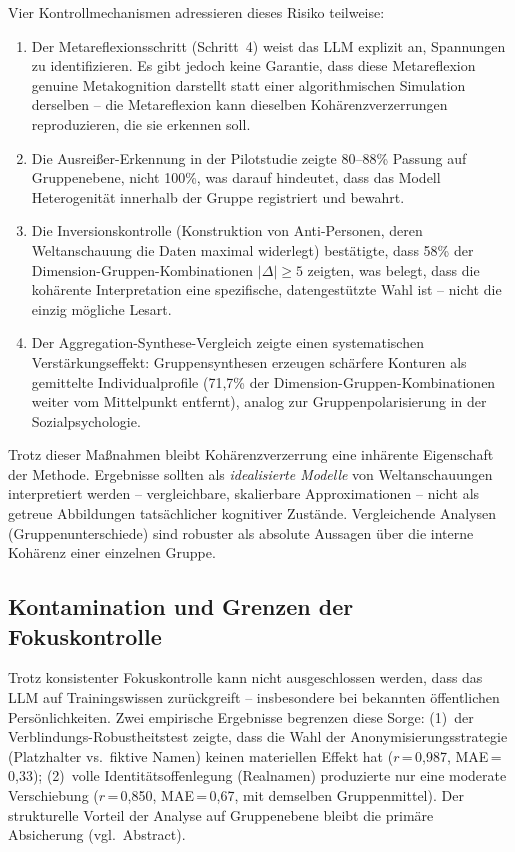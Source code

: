 \documentclass[11pt,a4paper]{article}
\begin{document}
Vier Kontrollmechanismen adressieren dieses Risiko teilweise:
\begin{enumerate}[nosep]
  \item Der Metareflexionsschritt (Schritt~4) weist das LLM explizit an, Spannungen zu identifizieren. Es gibt jedoch keine Garantie, dass diese Metareflexion genuine Metakognition darstellt statt einer algorithmischen Simulation derselben -- die Metareflexion kann dieselben Koh\"arenzverzerrungen reproduzieren, die sie erkennen soll.
  \item Die Ausrei\ss{}er-Erkennung in der Pilotstudie zeigte 80--88\% Passung auf Gruppenebene, nicht 100\%, was darauf hindeutet, dass das Modell Heterogenit\"at innerhalb der Gruppe registriert und bewahrt.
  \item Die Inversionskontrolle (Konstruktion von Anti-Personen, deren Weltanschauung die Daten maximal widerlegt) best\"atigte, dass 58\% der Dimension-Gruppen-Kombinationen $|\Delta| \geq 5$ zeigten, was belegt, dass die koh\"arente Interpretation eine spezifische, datengest\"utzte Wahl ist -- nicht die einzig m\"ogliche Lesart.
  \item Der Aggregation-Synthese-Vergleich zeigte einen systematischen Verst\"arkungseffekt: Gruppensynthesen erzeugen sch\"arfere Konturen als gemittelte Individualprofile (71,7\% der Dimension-Gruppen-Kombinationen weiter vom Mittelpunkt entfernt), analog zur Gruppenpolarisierung in der Sozialpsychologie.
\end{enumerate}

Trotz dieser Ma\ss{}nahmen bleibt Koh\"arenzverzerrung eine inh\"arente Eigenschaft der Methode. Ergebnisse sollten als \emph{idealisierte Modelle} von Weltanschauungen interpretiert werden -- vergleichbare, skalierbare Approximationen -- nicht als getreue Abbildungen tats\"achlicher kognitiver Zust\"ande. Vergleichende Analysen (Gruppenunterschiede) sind robuster als absolute Aussagen \"uber die interne Koh\"arenz einer einzelnen Gruppe.


\subsection{Kontamination und Grenzen der Fokuskontrolle}
\label{sec:limitations:contamination}

Trotz konsistenter Fokuskontrolle kann nicht ausgeschlossen werden, dass das LLM auf Trainingswissen zur\"uckgreift -- insbesondere bei bekannten \"offentlichen Pers\"onlichkeiten. Zwei empirische Ergebnisse begrenzen diese Sorge: (1)~der Verblindungs-Robustheitstest zeigte, dass die Wahl der Anonymisierungsstrategie (Platzhalter vs.\ fiktive Namen) keinen materiellen Effekt hat ($r$\,=\,0,987, MAE\,=\,0,33); (2)~volle Identit\"atsoffenlegung (Realnamen) produzierte nur eine moderate Verschiebung ($r$\,=\,0,850, MAE\,=\,0,67, mit demselben Gruppenmittel). Der strukturelle Vorteil der Analyse auf Gruppenebene bleibt die prim\"are Absicherung (vgl.\ Abstract).
\end{document}
